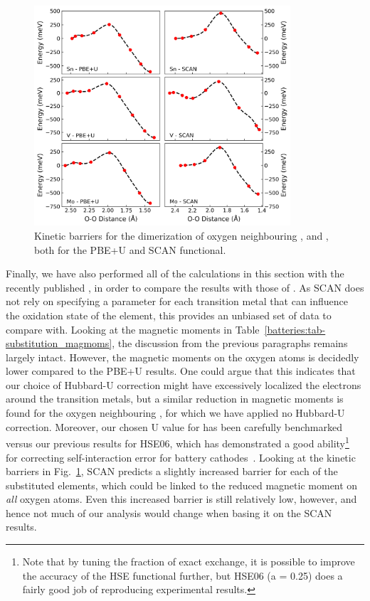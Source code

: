 \begin{refsection}
\newpage
\begin{figure}[ht] 
\centering 
\captionsetup{width=0.9\linewidth}
\includegraphics[width=0.85\textwidth]{figures/batteries/substitution_dimers.png} 
\caption{Kinetic barriers for the dimerization of oxygen neighbouring , 
 and , both for the PBE+U and SCAN functional. } 
\label{batteries:fig-substitution_dimers} 
\end{figure} 
 
Finally, we have also performed all of the calculations in this section with 
the recently published , in order to compare the results with 
those of . As SCAN does not rely on specifying a parameter for each 
transition metal that can influence the oxidation state of the element, this 
provides an unbiased set of data to compare with. Looking at the magnetic 
moments in Table~\ref{batteries:tab-substitution_magmoms}, the discussion from 
the previous paragraphs remains largely intact. However, the magnetic moments 
on the oxygen atoms is decidedly lower compared to the PBE+U results. One 
could argue that this indicates that our choice of Hubbard-U correction might 
have excessively localized the electrons around the transition metals, but a 
similar reduction in magnetic moments is found for the oxygen neighbouring 
, for which we have applied no Hubbard-U correction. Moreover, our 
chosen U value for  has been carefully benchmarked versus our previous 
results for HSE06, which has demonstrated a good ability\footnote{Note that by 
tuning the fraction of exact exchange, it is possible to improve the accuracy 
of the HSE functional further, but HSE06 (a = 0.25) does a fairly good job of 
reproducing experimental results.} for correcting self-interaction error for 
battery cathodes~\cite{Seo2015}. Looking at the kinetic barriers in 
Fig.~\ref{batteries:fig-substitution_dimers}, SCAN predicts a slightly 
increased barrier for each of the substituted elements, which could be linked 
to the reduced magnetic moment on \textit{all} oxygen atoms. Even this 
increased barrier is still relatively low, however, and hence not much of our 
analysis would change when basing it on the SCAN results. 


\end{refsection}
